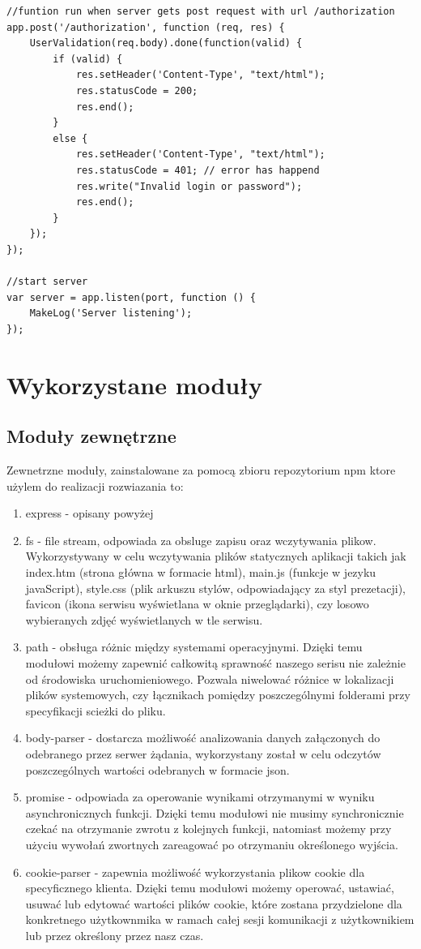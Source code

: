 \documentclass[12pt]{report}
\begin{document}
\begin{lstlisting}
//funtion run when server gets post request with url /authorization
app.post('/authorization', function (req, res) {
	UserValidation(req.body).done(function(valid) {
	    if (valid) {
	  	    res.setHeader('Content-Type', "text/html");
			res.statusCode = 200;
			res.end();
	   	}
        else {
            res.setHeader('Content-Type', "text/html");
			res.statusCode = 401; // error has happend
			res.write("Invalid login or password");
			res.end();
		}
    });
});

//start server
var server = app.listen(port, function () {
	MakeLog('Server listening');
});
\end{lstlisting}

\section{Wykorzystane moduły}

\subsection{Moduły zewnętrzne}
Zewnetrzne moduły, zainstalowane za pomocą zbioru repozytorium npm ktore użylem do realizacji rozwiazania to:
\begin{enumerate}
\item express - opisany powyżej
\item fs - file stream, odpowiada za obsluge zapisu oraz wczytywania plikow. 
Wykorzystywany w celu wczytywania plików statycznych aplikacji takich jak index.htm (strona główna w formacie html), main.js (funkcje w jezyku javaScript), style.css (plik arkuszu stylów, odpowiadający za styl prezetacji), favicon (ikona serwisu wyświetlana w oknie przeglądarki), czy losowo wybieranych zdjęć wyświetlanych w tle serwisu.
\item path - obsługa różnic między systemami operacyjnymi. 
Dzięki temu modułowi możemy zapewnić całkowitą sprawność naszego serisu nie zależnie od środowiska uruchomieniowego. 
Pozwala niwelować różnice w lokalizacji plików systemowych, czy łącznikach pomiędzy poszczególnymi folderami przy specyfikacji scieżki do pliku.
\item body-parser - dostarcza możliwość analizowania danych załączonych do odebranego przez serwer żądania, wykorzystany został w celu odczytów poszczególnych wartości odebranych w formacie json.
\item promise - odpowiada za operowanie wynikami otrzymanymi w wyniku asynchronicznych funkcji. 
Dzięki temu modułowi nie musimy synchronicznie czekać na otrzymanie zwrotu z kolejnych funkcji, natomiast możemy przy użyciu wywołań zwortnych zareagować po otrzymaniu określonego wyjścia.
\item cookie-parser - zapewnia możliwość wykorzystania plikow cookie dla specyficznego klienta. 
Dzięki temu modułowi możemy operować, ustawiać, usuwać lub edytować wartości plików cookie, które zostana przydzielone dla konkretnego użytkownmika w ramach całej sesji komunikacji z użytkownikiem lub przez określony przez nasz czas. 
\end{enumerate}
\end{document}
